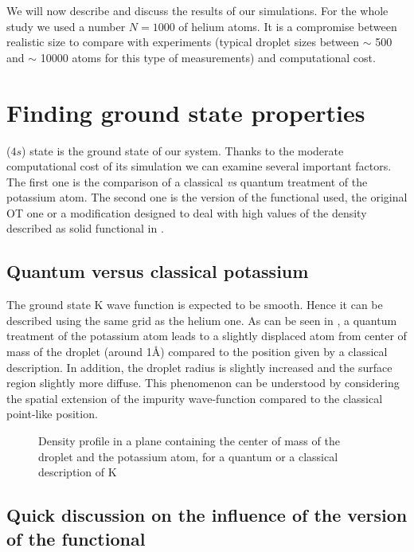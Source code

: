 We will now describe and discuss the results of our simulations. For the whole study we used a number  $N=1000$ of helium atoms. It is a compromise between realistic size to compare with experiments (typical droplet sizes between $\sim$ 500 and $\sim$ 10000 atoms for this type of measurements) and computational cost.

\section{Finding ground state properties}

($4s$) state is the ground state of our system. 
Thanks to the moderate computational cost of its simulation we can examine several important factors.
The first one is the comparison of a classical \textit{vs} quantum treatment of the potassium atom.
The second one is the version of the functional used, the original OT one or a modification designed to deal with high values of the density described as solid functional in .

\subsection{Quantum versus classical potassium}
\label{sec:4S-dia}

The ground state K wave function is expected to be smooth.
Hence it can be described using the same grid as the helium one. 
As can be seen in , a quantum treatment of the potassium atom leads to a slightly displaced atom from center of mass of the droplet (around 1\AA) compared to the position given by a classical description.
In addition, the droplet radius is slightly increased and the surface region slightly more diffuse.
This phenomenon can be understood by considering the spatial extension of the impurity wave-function compared to the classical point-like position.
\begin{figure}[h]
	\centering
	
	\vspace{-0.5\baselineskip}
	\caption{Density profile in a plane containing the center of mass of the droplet and the potassium atom, for a quantum or a classical description of K}
	\label{fig:4S-Q-C-lsolid}
\end{figure}

\subsection{Quick discussion on the influence of the version of the functional}

